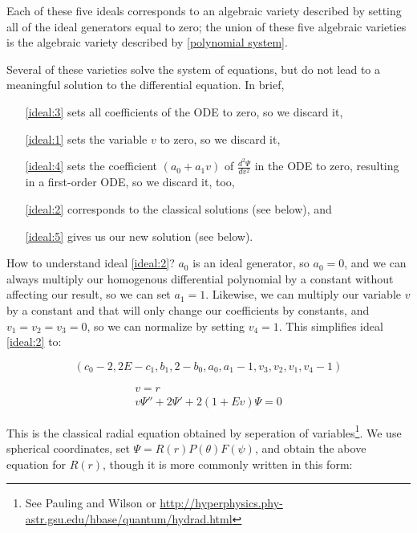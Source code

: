 \documentclass{article}
\begin{document}
Each of these five ideals corresponds to an algebraic variety described by setting
all of the ideal generators equal to zero; the union of these five algebraic varieties is the algebraic variety described by \eqref{polynomial system}.

Several of these varieties solve the system of equations, but do not lead to a meaningful solution to the differential equation.
In brief,

\begin{itemize}
\item[\eqref{ideal:3}] sets all coefficients of the ODE to zero, so we discard it,
\item[\eqref{ideal:1}] sets the variable $v$ to zero, so we discard it,
\item[\eqref{ideal:4}] sets the coefficient $(a_0 + a_1 v)$ of
$\frac{d^2\Psi}{dv^2}$
in the ODE to zero, resulting in a first-order ODE, so we discard it, too,
\item[\eqref{ideal:2}] corresponds to the classical solutions (see below), and
\item[\eqref{ideal:5}] gives us our new solution (see below).

\end{itemize}

How to understand ideal \eqref{ideal:2}?  $a_0$ is an ideal generator,
so $a_0=0$, and we can always multiply our homogenous differential polynomial by a constant without affecting our result, so we can set $a_1=1$.
Likewise, we can multiply our variable $v$ by a constant and that will only change our coefficients by constants,
and $v_1=v_2=v_3=0$, so we can normalize by setting $v_4=1$.  This simplifies ideal \eqref{ideal:2} to:

\begin{equation}
\left(c_{0} - 2, 2 E - c_{1}, b_{1}, 2 - b_{0}, a_{0}, a_{1}-1, v_{3}, v_{2}, v_{1}, v_{4}-1\right)
\end{equation}

\begin{equation}
\label{classical eq in ideal}
\begin{gathered}
v=r \\
v \Psi'' + 2 \Psi' + 2(1 + E v) \Psi = 0
\end{gathered}
\end{equation}

This is the classical radial equation obtained by seperation of variables\footnote{See
Pauling and Wilson or
\url{http://hyperphysics.phy-astr.gsu.edu/hbase/quantum/hydrad.html}}.  We use
spherical coordinates, set $\Psi = R(r)P(\theta)F(\psi)$, and obtain the above equation for $R(r)$,
though it is more commonly written in this form:
\end{document}
